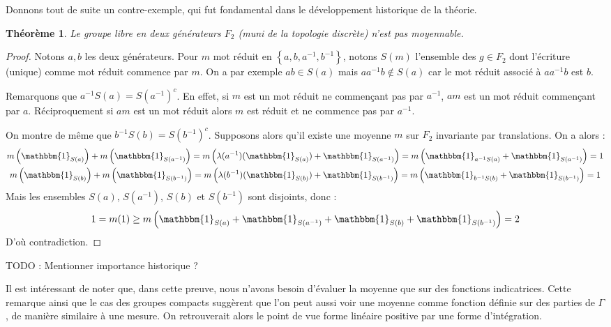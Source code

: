 \documentclass[a4paper,12pt]{article}
\newtheorem{theorem}{Théorème}[section]
\newcommand{\set}[1]{\left\{ #1 \right\}}
\newcommand{\indic}{\mathbbm{1}}
\newcommand{\inv}{^{-1}}
\newcommand{\compl}{^c}
\newcommand{\TODO}[1]{{\color{red}TODO :} #1}
\begin{document}
Donnons tout de suite un contre-exemple, qui fut fondamental dans le développement historique de la théorie.

\begin{theorem}\label{not_amenable_F2}
    Le groupe libre en deux générateurs $F_2$ (muni de la topologie discrète) n'est pas moyennable.
\end{theorem}

\begin{proof}
    Notons $a, b$ les deux générateurs. Pour $m$ mot réduit en $\set{a, b, a\inv, b\inv}$, notons 
    $S(m)$ l'ensemble des $g\in F_2$ dont l'écriture (unique) comme mot réduit
    commence par $m$. On a par exemple $ab\in S(a)$ mais $a a\inv b \notin S(a)$ car le mot réduit associé 
    à $a a\inv b$ est $b$.

    Remarquons que $a\inv S(a) = S(a\inv)\compl$. En effet, si $m$ est un mot réduit ne commençant pas par $a\inv$, 
    $am$ est un mot réduit commençant par $a$. Réciproquement si $am$ est un mot réduit alors $m$ est réduit et ne commence 
    pas par $a\inv$.

    On montre de même que $b\inv S(b) = S(b\inv)\compl$. Supposons alors qu'il existe une moyenne $m$ sur 
    $F_2$ invariante par translations. On a alors :
    \begin{gather*}
        m\left(\indic_{S(a)}\right) + m\left(\indic_{S(a\inv)}\right) = m\left(\lambda(a\inv)(\indic_{S(a)}) + \indic_{S(a\inv)}\right) = m\left(\indic_{a\inv S(a)} + \indic_{S(a\inv)}\right) = 1 \\
        m\left(\indic_{S(b)}\right) + m\left(\indic_{S(b\inv)}\right) = m\left(\lambda(b\inv)(\indic_{S(b)}) + \indic_{S(b\inv)}\right) = m\left(\indic_{b\inv S(b)} + \indic_{S(b\inv)}\right) = 1 \\
    \end{gather*}
    Mais les ensembles $S(a)$, $S(a\inv)$, $S(b)$ et $S(b\inv)$ sont disjoints, donc :
    \begin{equation*}
        1 = m(1) \ge m\left(\indic_{S(a)} + \indic_{S(a\inv)} + \indic_{S(b)} + \indic_{S(b\inv)}\right) = 2
    \end{equation*} 
    D'où contradiction.
\end{proof}

\TODO{Mentionner importance historique ?}

Il est intéressant de noter que, dans cette preuve, nous n'avons besoin d'évaluer la moyenne que sur des fonctions indicatrices.
Cette remarque ainsi que le cas des groupes compacts suggèrent que l'on peut aussi voir une moyenne comme fonction 
définie sur des parties de $\Gamma$, de manière similaire à une mesure. On retrouverait alors le point de vue \og{}forme 
linéaire positive\fg{} par une forme d'intégration.
\end{document}

